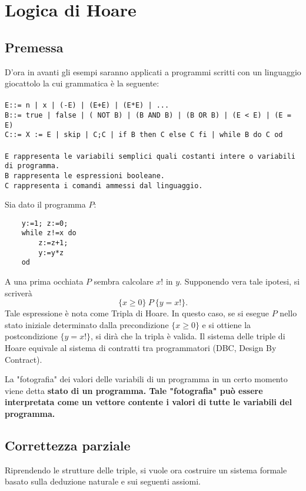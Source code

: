 \chapter{Logica di Hoare}
\label{chap:logicaHoare}
\section{Premessa}
D'ora in avanti gli esempi saranno applicati a programmi scritti con un linguaggio giocattolo la cui grammatica \`e la seguente:\\
\tt 
\\
E::= n | x | (-E) | (E+E) | (E*E) | ... \\ 
B::=  true | false | ( NOT B) | (B AND  B) | (B OR B) | (E < E) | (E = E)\\
C::= X := E | skip | C;C | if B then C else C fi | while B do C od
\rm \\
\\
\tt E \rm rappresenta le variabili semplici quali costanti intere o variabili di programma.\\
\tt B \rm rappresenta le espressioni booleane.\\
\tt C \rm rappresenta i comandi ammessi dal linguaggio.\\

\begin{es}
	Sia dato il programma $P$:
	\begin{lstlisting}
	y:=1; z:=0;
	while z!=x do
		z:=z+1;
		y:=y*z
	od
	\end{lstlisting}
\end{es}
A una prima occhiata $P$ sembra calcolare $x!$ in $y$. Supponendo vera tale ipotesi, si scriver\`a $$\{x \geq 0\}\ P\ \{y = x!\}.$$
Tale espressione \`e nota come Tripla di Hoare. In questo caso, se si esegue $P$ nello stato iniziale determinato dalla precondizione $\{x \geq 0\}$ e si ottiene la postcondizione $\{y = x!\}$, si dir\`a che la tripla \`e valida. Il sistema delle triple di Hoare equivale al sistema di contratti tra programmatori (DBC, Design By Contract).

\begin{deff}
	La "fotografia" dei valori delle variabili di un programma in un certo momento viene detta \bf stato di un programma\rm. Tale "fotografia" pu\`o essere interpretata come un vettore contente i valori di tutte le variabili del programma.
\end{deff}
\section{Correttezza parziale}
Riprendendo le strutture delle triple, si vuole ora costruire un sistema formale basato sulla deduzione naturale e sui seguenti assiomi.
